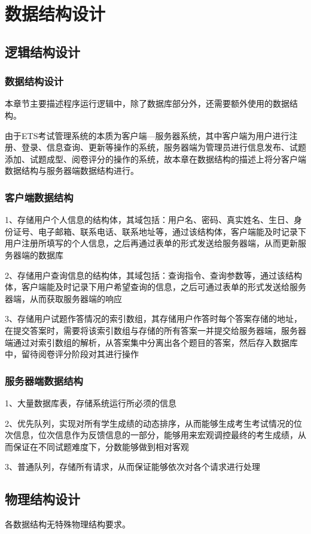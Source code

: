 \chapter{数据结构设计}
\section{逻辑结构设计}
\subsection{数据结构设计}
本章节主要描述程序运行逻辑中，除了数据库部分外，还需要额外使用的数据结构。

由于ETS考试管理系统的本质为客户端—服务器系统，其中客户端为用户进行注册、登录、信息查询、更新等操作的系统，服务器端为管理员进行信息发布、试题添加、试题成型、阅卷评分的操作的系统，故本章在数据结构的描述上将分客户端数据结构与服务器端数据结构进行。

\subsection{客户端数据结构}
1、存储用户个人信息的结构体，其域包括：用户名、密码、真实姓名、生日、身份证号、电子邮箱、联系电话、联系地址等，通过该结构体，客户端能及时记录下用户注册所填写的个人信息，之后再通过表单的形式发送给服务器端，从而更新服务器端的数据库

2、存储用户查询信息的结构体，其域包括：查询指令、查询参数等，通过该结构体，客户端能及时记录下用户希望查询的信息，之后可通过表单的形式发送给服务器端，从而获取服务器端的响应

3、存储用户试题作答情况的索引数组，其存储用户作答时每个答案存储的地址，在提交答案时，需要将该索引数组与存储的所有答案一并提交给服务器端，服务器端通过对索引数组的解析，从答案集中分离出各个题目的答案，然后存入数据库中，留待阅卷评分阶段对其进行操作

\subsection{服务器端数据结构}
1、大量数据库表，存储系统运行所必须的信息

2、优先队列，实现对所有学生成绩的动态排序，从而能够生成考生考试情况的位次信息，位次信息作为反馈信息的一部分，能够用来宏观调控最终的考生成绩，从而保证在不同试题难度下，分数能够做到相对客观

3、普通队列，存储所有请求，从而保证能够依次对各个请求进行处理

\section{物理结构设计}
各数据结构无特殊物理结构要求。

